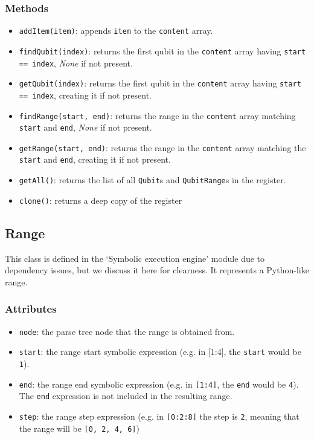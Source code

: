 \documentclass[12pt,a4paper]{report}
\theoremstyle{definition}
\theoremstyle{definition}
\theoremstyle{definition}
\begin{document}
\subsubsection{Methods}
\begin{itemize}
    \itemsep 0em
    \item \texttt{addItem(item)}: appends \texttt{item} to the \texttt{content} array.
    \item \texttt{findQubit(index)}: returns the first qubit in the \texttt{content} array having \texttt{start == index}, \textit{None} if not present.
    \item \texttt{getQubit(index)}: returns the first qubit in the \texttt{content} array having \texttt{start == index}, creating it if not present.
    \item \texttt{findRange(start, end)}: returns the range in the \texttt{content} array matching \texttt{start} and \texttt{end}, \textit{None} if not present.
    \item \texttt{getRange(start, end)}: returns the range in the \texttt{content} array matching the \texttt{start} and \texttt{end}, creating it if not present.
    \item \texttt{getAll()}: returns the list of all \texttt{Qubit}s and \texttt{QubitRange}s in the register.
    \item \texttt{clone()}: returns a deep copy of the register
\end{itemize}

\subsection{Range}
This class is defined in the `Symbolic execution engine' module due to dependency issues, but we discuss it here for clearness. It represents a Python-like range.
\subsubsection{Attributes}
\begin{itemize}
    \itemsep 0em
    \item \texttt{node}: the parse tree node that the range is obtained from.
    \item \texttt{start}: the range start symbolic expression (e.g. in [1:4], the \texttt{start} would be \texttt{1}).
    \item \texttt{end}: the range end symbolic expression (e.g. in \texttt{[1:4]}, the \texttt{end} would be \texttt{4}). The \texttt{end} expression is not included in the resulting range.
    \item \texttt{step}: the range step expression (e.g. in \texttt{[0:2:8]} the step is \texttt{2}, meaning that the range will be \texttt{[0, 2, 4, 6]})
\end{itemize}
\end{document}
